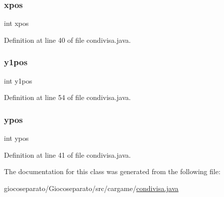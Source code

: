 \subsubsection{\texorpdfstring{xpos}{xpos}}
{\footnotesize\ttfamily int xpos\hspace{0.3cm}{\ttfamily [private]}}



Definition at line 40 of file condivisa.\+java.

\mbox{\label{classcargame_1_1condivisa_a48fa33e93e6fb92e83f1267b8c9b3b70}} 
\subsubsection{\texorpdfstring{y1pos}{y1pos}}
{\footnotesize\ttfamily int y1pos\hspace{0.3cm}{\ttfamily [private]}}



Definition at line 54 of file condivisa.\+java.

\mbox{\label{classcargame_1_1condivisa_a4db09a4236b6f591c377857b932eb41a}} 
\subsubsection{\texorpdfstring{ypos}{ypos}}
{\footnotesize\ttfamily int ypos\hspace{0.3cm}{\ttfamily [private]}}



Definition at line 41 of file condivisa.\+java.



The documentation for this class was generated from the following file\+:\begin{DoxyCompactItemize}
\item 
giocoseparato/\+Giocoseparato/src/cargame/\hyperlink{condivisa_8java}{condivisa.\+java}\end{DoxyCompactItemize}
